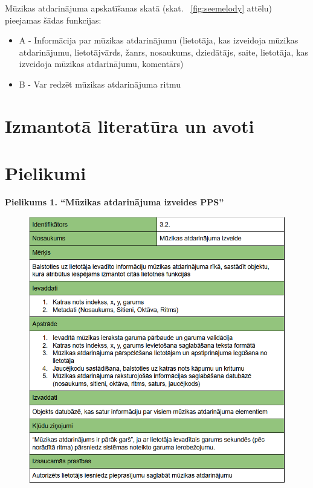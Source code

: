 \documentclass[12pt]{article}
\begin{document}
Mūzikas atdarinājuma apskatīšanas skatā (skat. ~\ref{fig:seemelody} attēlu) pieejamas šādas funkcijas:

\begin{itemize}
	\item A - Informācija par mūzikas atdarinājumu (lietotāja, kas izveidoja mūzikas atdarinājumu, lietotājvārds, žanrs, nosaukums, dziedātājs, saite, lietotāja, kas izveidoja mūzikas atdarinājumu, komentārs)
	\item B - Var redzēt mūzikas atdarinājuma ritmu
\end{itemize}

\pagebreak

\section*{Izmantotā literatūra un avoti}

\printbibliography

\pagebreak

\section*{Pielikumi}

\centering \textbf{Pielikums 1. ``Mūzikas atdarinājuma izveides PPS''}
\begin{figure}[H]
\begin{center}
	\includegraphics[scale=0.8]{Capture3.png}
	\label{fig:muzikasPPS}
\end{center}
\end{figure}
\end{document}
